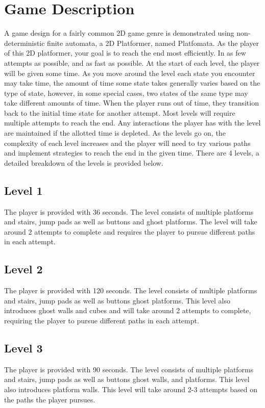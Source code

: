 \documentclass[10pt,twocolumn]{article}
\begin{document}
\section*{Game Description}
A game design for a fairly common 2D game genre is demonstrated using non-deterministic finite automata, a 2D Platformer, named Platfomata. As the player of this 2D platformer, your goal is to reach the end most efficiently. In as few attempts as possible, and as fast as possible. At the start of each level, the player will be given some time. As you move around the level each state you encounter may take time, the amount of time some state takes generally varies based on the type of state, however, in some special cases, two states of the same type may take different amounts of time. When the player runs out of time, they transition back to the initial time state for another attempt. Most levels will require multiple attempts to reach the end. Any interactions the player has with the level are maintained if the allotted time is depleted. As the levels go on, the complexity of each level increases and the player will need to try various paths and implement strategies to reach the end in the given time. There are 4 levels, a detailed breakdown of the levels is provided below.

\subsection*{Level 1}
The player is provided with 36 seconds. The level consists of multiple platforms and stairs, jump pads as well as buttons and ghost platforms. The level will take around 2 attempts to complete and requires the player to pursue different paths in each attempt.

\subsection*{Level 2}
The player is provided with 120 seconds. The level consists of multiple platforms and stairs, jump pads as well as buttons ghost platforms. This level also introduces ghost walls and cubes and will take around 2 attempts to complete, requiring the player to pursue different paths in each attempt.

\subsection*{Level 3}
The player is provided with 90 seconds. The level consists of multiple platforms and stairs, jump pads as well as buttons ghost walls, and platforms. This level also introduces platform walls. This level will take around 2-3 attempts based on the paths the player pursues.
\end{document}
